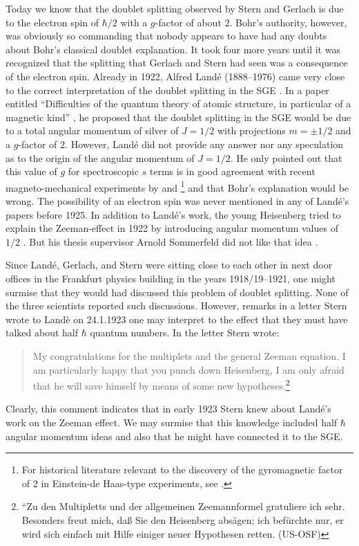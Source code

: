 \documentclass{article}
\begin{document}
Today we know that the doublet splitting observed by Stern and Gerlach is due to the electron spin of $\hbar/2$ with a $g$-factor of about $2$. Bohr's authority, however, was obviously so commanding that nobody appears to have had any doubts about Bohr's classical doublet explanation.  It took four more years until it was recognized that the splitting that Gerlach and Stern had seen was a consequence of the electron spin. Already in 1922, Alfred Landé (1888--1976) came very close to the correct interpretation of the doublet splitting in the SGE \citep{LandeA1921Zeemaneffekt2,LandeA1921Zeemaneffekt,LandeA1929Polarisation}. In a paper entitled ``Difficulties of the quantum theory of atomic structure, in particular of a magnetic kind” 
\citep{LandeA1924Schwierigkeiten}, he proposed that the doublet splitting in the SGE would be due to a total angular momentum of silver of $J=1/2$ with projections $m=\pm 1/2$ and a $g$-factor of $2$. However, Landé did not provide any answer nor any speculation as to the origin of the angular momentum of $J=1/2$. He only pointed out that this value of $g$ for spectroscopic $s$ terms is in good agreement with recent magneto-mechanical experiments by \cite{BarnettS1915Magnetization} and \cite{EinsteinAEtAl1915Nachweis}\footnote{For historical literature relevant to the discovery of the gyromagnetic factor of 2 in Einstein-de Haas-type experiments, see \cite[Doc.~215]{CPAE10}.}
 and that Bohr's explanation would be wrong. The possibility of an electron spin was never mentioned in any of Landé's papers before 1925. In addition to Landé's work, the young Heisenberg tried to explain the Zeeman-effect in 1922 by introducing angular momentum values of $1/2$ \citep{HeisenbergW1922Quantentheorie}. But his thesis supervisor Arnold Sommerfeld did not like that idea \cite[secs.~8.4--8.5]{EckertM2013Sommerfled}.
 
Since Landé, Gerlach, and Stern were sitting close to each other in next door offices in the Frankfurt physics building in the years 1918/19--1921, one might surmise that they would had discussed this problem of doublet splitting. None of the three scientists reported such discussions. However, remarks in a letter Stern wrote to Landè on 24.1.1923 one may interpret to the effect that they must have talked about half $\hbar$ quantum numbers. In the letter Stern wrote: 
\begin{quote}
My congratulations for the multiplets and the general Zeeman equation. I am particularly happy that you punch down Heisenberg, I am only afraid that he will save himself by means of some new hypotheses.\footnote{%
``Zu den Multipletts und der allgemeinen Zeemannformel gratuliere ich sehr. Besonders freut mich, daß Sie den Heisenberg absägen; ich befürchte nur, er wird sich einfach mit Hilfe einiger neuer Hypothesen retten. (US-OSF)}
\end{quote}
Clearly, this comment indicates that in early 1923 Stern knew about Landé's work on the Zeeman effect. We may surmise that this knowledge included half $\hbar$ angular momentum ideas and also that he might have connected it to the SGE.
\end{document}
